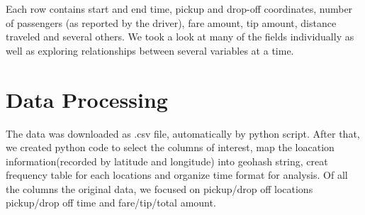\documentclass{article}
\begin{document}
Each row contains start and end time, pickup and drop-off coordinates, number of passengers (as reported by the driver), fare amount, tip amount, distance traveled and several others. We took a look at many of the fields individually as well as exploring relationships between several variables at a time.


\section{Data Processing}
The data was downloaded as .csv file, automatically by python script. After
that, we created python code to select the columns of interest, map the
loacation information(recorded by latitude and longitude) into geohash string,
creat frequency table for each locations and organize time format for
analysis. Of all the columns the original data, we focused on pickup/drop off
locations pickup/drop off time and fare/tip/total amount. 
\end{document}
